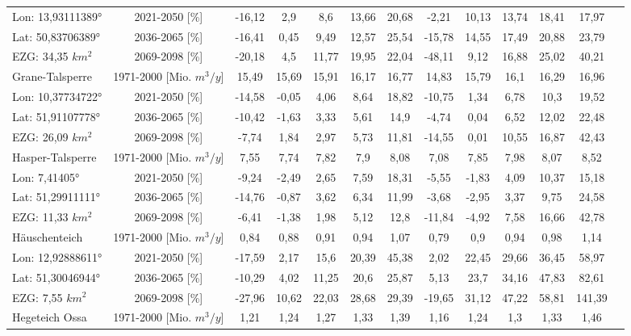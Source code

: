 \begin{longtable}{@{\extracolsep{\fill}}lc|ccccc||cccccc}
\cline{2-13} 
Lon: 13,93111389° & 2021-2050 [\%]  & -16,12 & 2,9 & 8,6 & 13,66 & 20,68 & -2,21 & 10,13 & 13,74 & 18,41 & 17,97 & \\ 
Lat: 50,83706389° & 2036-2065 [\%]  & -16,41 & 0,45 & 9,49 & 12,57 & 25,54 & -15,78 & 14,55 & 17,49 & 20,88 & 23,79 & \\ 
EZG: 34,35 $km^2$ & 2069-2098 [\%]  & -20,18 & 4,5 & 11,77 & 19,95 & 22,04 & -48,11 & 9,12 & 16,88 & 25,02 & 40,21 & \\ 
\hline 
Grane-Talsperre & 1971-2000 [Mio. $m^3/y$]  & 15,49 & 15,69 & 15,91 & 16,17 & 16,77 & 14,83 & 15,79 & 16,1 & 16,29 & 16,96 & \\ 
\cline{2-13} 
Lon: 10,37734722° & 2021-2050 [\%]  & -14,58 & -0,05 & 4,06 & 8,64 & 18,82 & -10,75 & 1,34 & 6,78 & 10,3 & 19,52 & \\ 
Lat: 51,91107778° & 2036-2065 [\%]  & -10,42 & -1,63 & 3,33 & 5,61 & 14,9 & -4,74 & 0,04 & 6,52 & 12,02 & 22,48 & \\ 
EZG: 26,09 $km^2$ & 2069-2098 [\%]  & -7,74 & 1,84 & 2,97 & 5,73 & 11,81 & -14,55 & 0,01 & 10,55 & 16,87 & 42,43 & \\ 
\hline 
Hasper-Talsperre & 1971-2000 [Mio. $m^3/y$]  & 7,55 & 7,74 & 7,82 & 7,9 & 8,08 & 7,08 & 7,85 & 7,98 & 8,07 & 8,52 & \\ 
\cline{2-13} 
Lon: 7,41405° & 2021-2050 [\%]  & -9,24 & -2,49 & 2,65 & 7,59 & 18,31 & -5,55 & -1,83 & 4,09 & 10,37 & 15,18 & \\ 
Lat: 51,29911111° & 2036-2065 [\%]  & -14,76 & -0,87 & 3,62 & 6,34 & 11,99 & -3,68 & -2,95 & 3,37 & 9,75 & 24,58 & \\ 
EZG: 11,33 $km^2$ & 2069-2098 [\%]  & -6,41 & -1,38 & 1,98 & 5,12 & 12,8 & -11,84 & -4,92 & 7,58 & 16,66 & 42,78 & \\ 
\hline 
Häuschenteich & 1971-2000 [Mio. $m^3/y$]  & 0,84 & 0,88 & 0,91 & 0,94 & 1,07 & 0,79 & 0,9 & 0,94 & 0,98 & 1,14 & \\ 
\cline{2-13} 
Lon: 12,92888611° & 2021-2050 [\%]  & -17,59 & 2,17 & 15,6 & 20,39 & 45,38 & 2,02 & 22,45 & 29,66 & 36,45 & 58,97 & \\ 
Lat: 51,30046944° & 2036-2065 [\%]  & -10,29 & 4,02 & 11,25 & 20,6 & 25,87 & 5,13 & 23,7 & 34,16 & 47,83 & 82,61 & \\ 
EZG: 7,55 $km^2$ & 2069-2098 [\%]  & -27,96 & 10,62 & 22,03 & 28,68 & 29,39 & -19,65 & 31,12 & 47,22 & 58,81 & 141,39 & \\ 
\hline 
Hegeteich Ossa & 1971-2000 [Mio. $m^3/y$]  & 1,21 & 1,24 & 1,27 & 1,33 & 1,39 & 1,16 & 1,24 & 1,3 & 1,33 & 1,46 & \\ 

\end{longtable}
